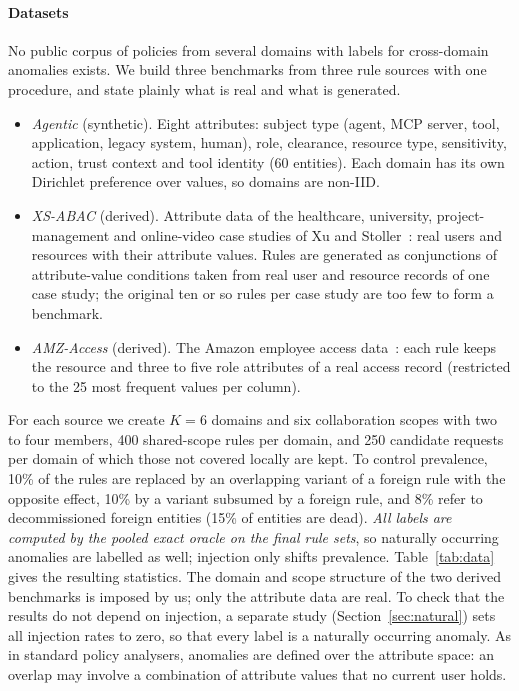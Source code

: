 \documentclass[preprint,12pt]{elsarticle}
\theoremstyle{definition}
\begin{document}
\paragraph{Datasets} No public corpus of policies from several domains with labels for cross-domain anomalies exists. We build three benchmarks from three rule sources with one procedure, and state plainly what is real and what is generated.
\begin{itemize}
\item \emph{Agentic} (synthetic). Eight attributes: subject type (agent, MCP server, tool, application, legacy system, human), role, clearance, resource type, sensitivity, action, trust context and tool identity (60 entities). Each domain has its own Dirichlet preference over values, so domains are non-IID.
\item \emph{XS-ABAC} (derived). Attribute data of the healthcare, university, project-management and online-video case studies of Xu and Stoller~\cite{xu2015mining}: real users and resources with their attribute values. Rules are generated as conjunctions of attribute-value conditions taken from real user and resource records of one case study; the original ten or so rules per case study are too few to form a benchmark.
\item \emph{AMZ-Access} (derived). The Amazon employee access data~\cite{amazon2013access}: each rule keeps the resource and three to five role attributes of a real access record (restricted to the 25 most frequent values per column).
\end{itemize}
For each source we create $K=6$ domains and six collaboration scopes with two to four members, 400 shared-scope rules per domain, and 250 candidate requests per domain of which those not covered locally are kept. To control prevalence, 10\% of the rules are replaced by an overlapping variant of a foreign rule with the opposite effect, 10\% by a variant subsumed by a foreign rule, and 8\% refer to decommissioned foreign entities (15\% of entities are dead). \emph{All labels are computed by the pooled exact oracle on the final rule sets}, so naturally occurring anomalies are labelled as well; injection only shifts prevalence. Table~\ref{tab:data} gives the resulting statistics. The domain and scope structure of the two derived benchmarks is imposed by us; only the attribute data are real. To check that the results do not depend on injection, a separate study (Section~\ref{sec:natural}) sets all injection rates to zero, so that every label is a naturally occurring anomaly. As in standard policy analysers, anomalies are defined over the attribute space: an overlap may involve a combination of attribute values that no current user holds.
\end{document}
